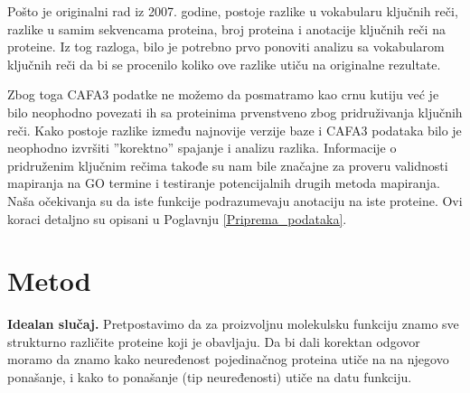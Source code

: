 Pošto je originalni rad iz 2007. godine, postoje razlike u
vokabularu ključnih reči, razlike u samim sekvencama proteina, broj proteina i
anotacije ključnih reči na proteine.  Iz tog razloga, bilo je potrebno
prvo ponoviti analizu sa vokabularom ključnih reči da bi se procenilo koliko
ove razlike utiču na originalne rezultate.

Zbog toga CAFA3 podatke ne možemo da posmatramo kao crnu kutiju već je
bilo neophodno povezati ih sa \swissprot proteinima prvenstveno zbog
pridruživanja ključnih reči. Kako postoje razlike između najnovije verzije \swissprot
baze i CAFA3 podataka bilo je neophodno izvršiti ''korektno'' spajanje i
analizu razlika.  Informacije o pridruženim ključnim rečima takođe su nam bile
značajne za proveru validnosti mapiranja na GO termine i testiranje
potencijalnih drugih metoda mapiranja. Naša očekivanja su da iste funkcije
podrazumevaju anotaciju na iste proteine.  Ovi koraci detaljno su opisani u
Poglavnju \ref{Priprema_podataka}.



\section {Metod}


\textbf{Idealan slučaj.} 
Pretpostavimo da za proizvoljnu molekulsku funkciju znamo sve strukturno različite
proteine koji je obavljaju.  Da bi dali korektan odgovor  moramo da znamo kako
neuređenost pojedinačnog proteina utiče na
na njegovo ponašanje, i kako to ponašanje (tip neuređenosti) utiče na datu funkciju.

